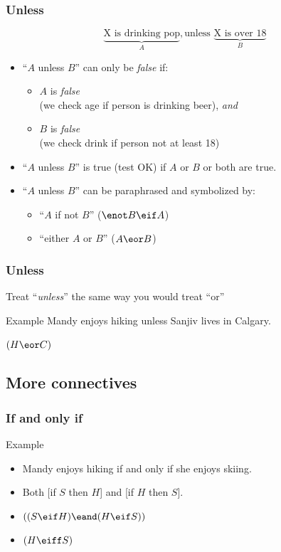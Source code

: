 \begin{frame}
\frametitle{Unless}

\[\underbrace{\text{X is drinking pop}}_{A},
\text{unless\ }\underbrace{\text{X is over 18}}_{B}\]

\begin{itemize}[<+->]
\item ``$A$ unless $B$'' can only be \emph{false} if:
\begin{itemize}
\item $A$ is \emph{false}\\
(we check age if person is drinking beer), \emph{and}
\item $B$ is \emph{false}\\
(we check drink if person not at least 18)
\end{itemize}
\item ``$A$ unless $B$'' is true (test OK) if
$A$ or $B$ or both are true.
\item ``$A$ unless $B$'' can be paraphrased and symbolized by:
\begin{itemize}
\item ``$A$ if not $B$'' ($\enot B \eif A$)
\item ``either $A$ or $B$'' ($A \eor B$)
\end{itemize}
\end{itemize}

\end{frame}

\begin{frame}
  \frametitle{Unless}

  Treat ``\emph{unless}'' the same way you would treat ``or''

  \begin{block}{Example}
  Mandy enjoys hiking unless Sanjiv lives in Calgary.

  $(H \eor C)$
  \end{block}
\end{frame}


\subsection{More connectives}

\begin{frame}
  \frametitle{If and only if}

  \begin{block}{Example}
    \begin{itemize}[<+->]
    \item[] Mandy enjoys hiking if and only if she enjoys skiing.
    \item[] Both [if $S$ then $H$] and [if $H$ then $S$].
    \item[] $((S \eif H)\eand(H \eif S))$
    \item[] $(H \eiff S)$
    \end{itemize}
  \end{block}

\end{frame}

